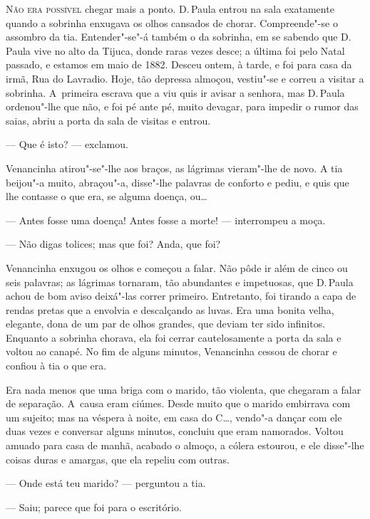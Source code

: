 \begin{linenumbers}

\textsc{Não era possível} chegar mais a ponto. D.\,Paula entrou na sala exatamente
quando a sobrinha enxugava os olhos cansados de chorar. Compreende"-se o
assombro da tia. Entender"-se"-á também o da sobrinha, em se sabendo que
D.\,Paula vive no alto da Tijuca, donde raras vezes desce; a última foi
pelo Natal passado, e estamos em maio de 1882. Desceu ontem, à tarde, e
foi para casa da irmã, Rua do Lavradio. Hoje, tão depressa almoçou,
vestiu"-se e correu a visitar a sobrinha. A~primeira escrava que a viu
quis ir avisar a senhora, mas D.\,Paula ordenou"-lhe que não, e foi pé
ante pé, muito devagar, para impedir o rumor das saias, abriu a porta da
sala de visitas e entrou.

--- Que é isto? --- exclamou.

Venancinha atirou"-se"-lhe aos braços, as lágrimas vieram"-lhe de novo. A
tia beijou"-a muito, abraçou"-a, disse"-lhe palavras de conforto e pediu, e
quis que lhe contasse o que era, se alguma doença, ou\ldots{}

--- Antes fosse uma doença! Antes fosse a morte! --- interrompeu a moça.

--- Não digas tolices; mas que foi? Anda, que foi?

Venancinha enxugou os olhos e começou a falar. Não pôde ir além de cinco
ou seis palavras; as lágrimas tornaram, tão abundantes e impetuosas, que
D.\,Paula achou de bom aviso deixá"-las correr primeiro. Entretanto, foi
tirando a capa de rendas pretas que a envolvia e descalçando as luvas.
Era uma bonita velha, elegante, dona de um par de olhos grandes, que
deviam ter sido infinitos. Enquanto a sobrinha chorava, ela foi cerrar
cautelosamente a porta da sala e voltou ao canapé. No fim de alguns
minutos, Venancinha cessou de chorar e confiou à tia o que era.

Era nada menos que uma briga com o marido, tão violenta, que chegaram a
falar de separação. A~causa eram ciúmes. Desde muito que o marido
embirrava com um sujeito; mas na véspera à noite, em casa do C\ldots{},
vendo"-a dançar com ele duas vezes e conversar alguns minutos, concluiu
que eram namorados. Voltou amuado para casa de manhã, acabado o almoço,
a cólera estourou, e ele disse"-lhe coisas duras e amargas, que ela
repeliu com outras.

--- Onde está teu marido? --- perguntou a tia.

--- Saiu; parece que foi para o escritório.


\end{linenumbers}
